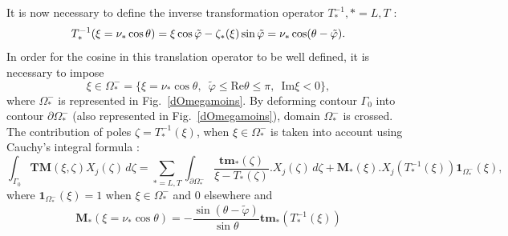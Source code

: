 It is now necessary to define the inverse transformation operator $T_*^{-1}, *=L,T$ :
\begin{equation}
T_*^{-1}(\xi=\nu_*\cos\theta)=\xi \cos \tilde{\varphi}-\zeta_*(\xi)\sin\tilde{\varphi}=\nu_*\cos(\theta-\tilde{\varphi}).
\end{equation}
In order for the cosine in this translation operator to be well defined, it is necessary to impose
\begin{equation}
\xi \in \Omega_*^-=\{\xi=\nu_*\cos\theta, \, \, \, \tilde{\varphi}\leq \mbox{Re}\theta\leq\pi, \, \, \, \mbox{Im}\xi< 0\},
\end{equation}
where $\Omega_*^-$ is represented in Fig.~\ref{dOmegamoins}. By deforming contour $\Gamma_0$ into contour $\partial \Omega_*^-$ (also represented in Fig.~\ref{dOmegamoins}), domain $\Omega_*^-$ is crossed. The contribution of poles $\zeta=T_*^{-1}(\xi)$, when $\xi\in\Omega_*^-$  is taken into account using Cauchy's integral formula :
\begin{equation}
\int_{\Gamma_0} \textbf{TM}(\xi,\zeta)X_j(\zeta)\, d\zeta = \sum_{*=L,T}\int_{\partial \Omega_*^-}  \dfrac{\textbf{tm}_*(\zeta)}{\xi-T_*(\zeta)}.X_j(\zeta)\, d\zeta+ \mathbf{M}_*(\xi).X_j(T^{-1}_*(\xi))\textbf{1}_{\Omega_*^-}(\xi),
\label{TM2}
\end{equation}
where $\textbf{1}_{\Omega_*^-}(\xi)=1$ when $\xi \in \Omega_*^-$ and $0$ elsewhere and
\begin{equation}
\mathbf{M}_*(\xi=\nu_*\cos\theta)=-\frac{\sin(\theta-\tilde{\varphi})}{\sin\theta} \textbf{tm}_*(T_*^{-1}(\xi))
\end{equation}

